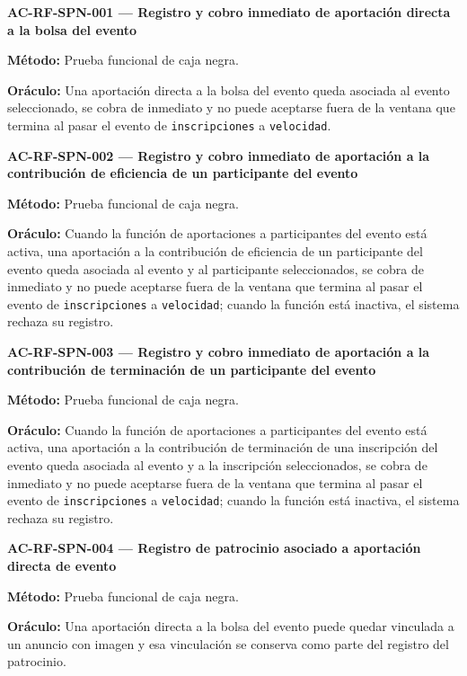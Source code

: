 \documentclass[10pt,letterpaper]{article}
\begin{document}
\noindent\textbf{AC-RF-SPN-001 --- Registro y cobro inmediato de aportación directa a la bolsa del evento}\par
\textbf{Método:} Prueba funcional de caja negra.\par
\textbf{Oráculo:} Una aportación directa a la bolsa del evento queda asociada al evento seleccionado, se cobra de inmediato y no puede aceptarse fuera de la ventana que termina al pasar el evento de \texttt{inscripciones} a \texttt{velocidad}.\par\vspace{0.45em}
\noindent\textbf{AC-RF-SPN-002 --- Registro y cobro inmediato de aportación a la contribución de eficiencia de un participante del evento}\par
\textbf{Método:} Prueba funcional de caja negra.\par
\textbf{Oráculo:} Cuando la función de aportaciones a participantes del evento está activa, una aportación a la contribución de eficiencia de un participante del evento queda asociada al evento y al participante seleccionados, se cobra de inmediato y no puede aceptarse fuera de la ventana que termina al pasar el evento de \texttt{inscripciones} a \texttt{velocidad}; cuando la función está inactiva, el sistema rechaza su registro.\par\vspace{0.45em}
\noindent\textbf{AC-RF-SPN-003 --- Registro y cobro inmediato de aportación a la contribución de terminación de un participante del evento}\par
\textbf{Método:} Prueba funcional de caja negra.\par
\textbf{Oráculo:} Cuando la función de aportaciones a participantes del evento está activa, una aportación a la contribución de terminación de una inscripción del evento queda asociada al evento y a la inscripción seleccionados, se cobra de inmediato y no puede aceptarse fuera de la ventana que termina al pasar el evento de \texttt{inscripciones} a \texttt{velocidad}; cuando la función está inactiva, el sistema rechaza su registro.\par\vspace{0.45em}
\noindent\textbf{AC-RF-SPN-004 --- Registro de patrocinio asociado a aportación directa de evento}\par
\textbf{Método:} Prueba funcional de caja negra.\par
\textbf{Oráculo:} Una aportación directa a la bolsa del evento puede quedar vinculada a un anuncio con imagen y esa vinculación se conserva como parte del registro del patrocinio.\par\vspace{0.45em}
\end{document}
